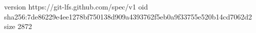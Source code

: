 version https://git-lfs.github.com/spec/v1
oid sha256:7de86229e4ee1278bf750138d909a4393762f5eb0a9f33755e520b14cd7062d2
size 2872

